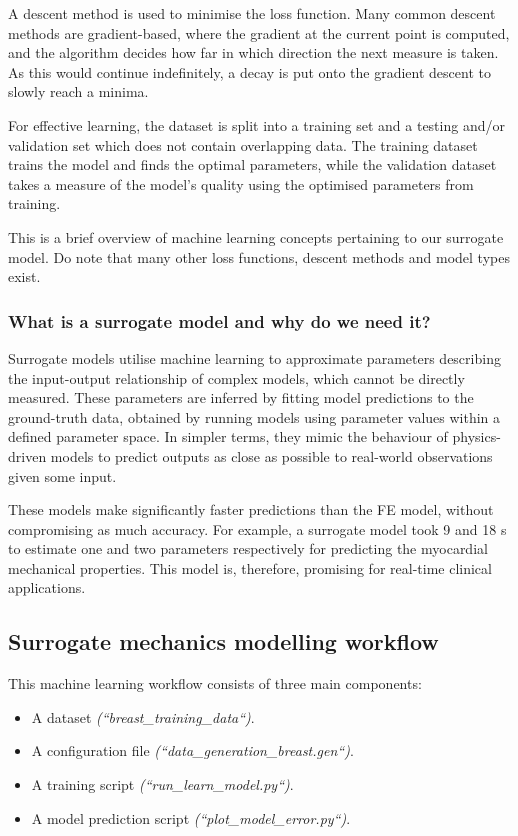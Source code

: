 \documentclass[11pt]{article}
\providecommand{\tightlist}{%
      \setlength{\itemsep}{0pt}\setlength{\parskip}{0pt}}
\begin{document}
A descent method is used to minimise the loss function. Many common descent methods are gradient-based, where the gradient at the current point is computed, and the algorithm decides how far in which direction the next measure is taken. As this would continue indefinitely, a decay is put onto the gradient descent to slowly reach a minima. 

For effective learning, the dataset is split into a training set and a testing and/or validation set which does not contain overlapping data. The training dataset trains the model and finds the optimal parameters, while the validation dataset takes a measure of the model's quality using the optimised parameters from training.

This is a brief overview of machine learning concepts pertaining to our surrogate model. Do note that many other loss functions, descent methods and model types exist.

\subsubsection{What is a surrogate model and why do we need it?}
 Surrogate models utilise machine learning to approximate parameters describing the input-output relationship of complex models, which cannot be directly measured. These parameters are inferred by fitting model predictions to the ground-truth data, obtained by running models using parameter values within a defined parameter space. In simpler terms, they mimic the behaviour of physics-driven models to predict outputs as close as possible to real-world observations given some input. 
 
 These models make significantly faster predictions than the FE model, without compromising as much accuracy. For example, a surrogate model took 9 and 18 s to estimate one and two parameters respectively for predicting the myocardial mechanical properties. This model is, therefore, promising for real-time clinical applications.

\subsection{Surrogate mechanics modelling workflow}
This machine learning workflow consists of three main components:

\begin{itemize}
\tightlist
\item A dataset \textit{(``breast\_training\_data``)}.
\item A configuration file \textit{(``data\_generation\_breast.gen``)}.
\item A training script \textit{(``run\_learn\_model.py``)}.
\item A model prediction script \textit{(``plot\_model\_error.py``)}.

\end{itemize}
\end{document}
